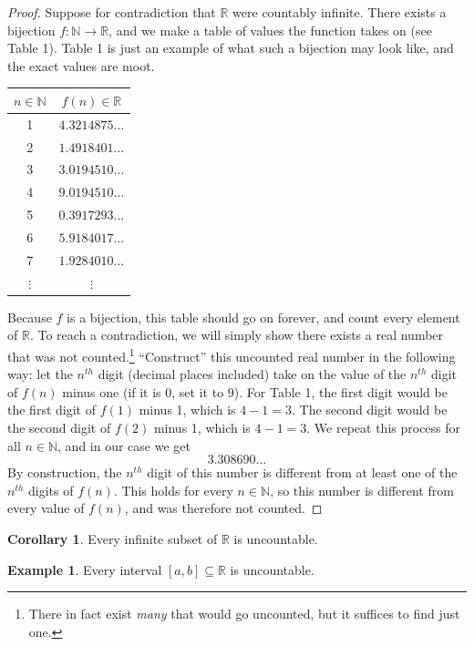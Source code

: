 \documentclass{article}
\newcommand{\N}{\mathbb{N}}
\newcommand{\R}{\mathbb{R}}
\theoremstyle{definition}
\newtheorem{corollary}{Corollary}[section]
\newtheorem{example}{Example}[section]
\begin{document}
	\begin{proof}
		Suppose for contradiction that $ \R $ were countably infinite. There exists a bijection $ f:\N\to\R $, and we make a table of values the function takes on (see Table 1). Table 1 is just an example of what such a bijection may look like, and the exact values are moot.
		\begin{table}[h!]
			\centering
			\begin{tabular}{cc}
				$ n\in\N  $       & $ f(n)\in\R $              \\ \hline
				1        & $4.3214875\ldots$ \\
				2        & $1.4918401\ldots$           \\
				3        & $3.0194510\ldots$                   \\
				4        & $9.0194510\ldots$                  \\
				5        & $0.3917293\ldots $               \\
				6        & $ 5.9184017\ldots $\\
				7        & $ 1.9284010\ldots $                \\
				$\vdots$ & $\vdots$         
			\end{tabular}
		\end{table}
		Because $ f $ is a bijection, this table should go on forever, and count every element of $ \R $. To reach a contradiction, we will simply show there exists a real number that was not counted.\footnote{There in fact exist \textit{many} that would go uncounted, but it suffices to find just one.} ``Construct'' this uncounted real number in the following way: let the $ n^{th} $ digit (decimal places included) take on the value of the $ n^{th}$ digit of $ f(n) $ minus one (if it is $ 0 $, set it to $ 9 $). For Table 1, the first digit would be the first digit of $ f(1) $ minus 1, which is $ 4-1=3 $. The second digit would be the second digit of $ f(2) $ minus 1, which is $4-1=3$. We repeat this process for all $ n\in\N $, and in our case we get $$3.308690\ldots $$
		By construction, the $ n^{th} $ digit of this number is different from at least one of the $ n^{th} $ digits of $ f(n) $. This holds for every $ n\in\N $, so this number is different from every value of $ f(n) $, and was therefore not counted.  
	\end{proof}
	\begin{corollary}
		Every infinite subset of $ \R $ is uncountable.
	\end{corollary}
	\begin{example}
		Every interval $ [a,b]\subseteq\R $ is uncountable. 
	\end{example}
\end{document}
